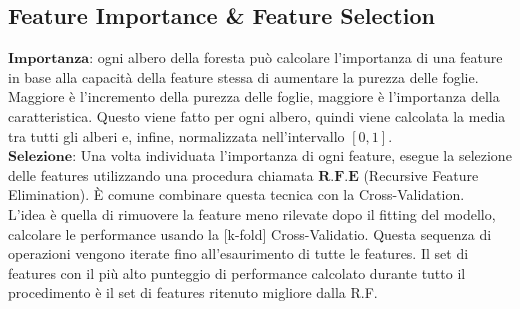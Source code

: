     \subsection{Feature Importance \& Feature Selection}
        $\textbf{Importanza:}$ ogni albero della foresta può calcolare l'importanza di una feature in base alla capacità della feature stessa di aumentare la purezza delle foglie.
        \\
        Maggiore è l'incremento della purezza delle foglie, maggiore è l'importanza della caratteristica. Questo viene fatto per ogni albero, quindi viene calcolata la media tra tutti gli alberi e, infine, normalizzata nell'intervallo $[0,1]$.
        \\[2\baselineskip]
        $\textbf{Selezione:}$ Una volta individuata l'importanza di ogni feature, esegue la selezione delle features utilizzando una procedura chiamata $\textbf{R.F.E}$ (Recursive Feature Elimination).
        È comune combinare questa tecnica con la Cross-Validation.
        \\[1\baselineskip]
        L'idea è quella di rimuovere la feature meno rilevate dopo il fitting del modello, calcolare le performance usando la [k-fold] Cross-Validatio.
        Questa sequenza di operazioni vengono iterate fino all'esaurimento di tutte le features.
        Il set di features con il più alto punteggio di performance calcolato durante tutto il procedimento è il set di features ritenuto migliore dalla R.F.
        
    \clearpage